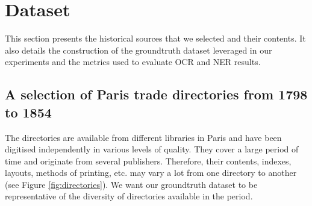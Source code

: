 \section{Dataset}
\label{sec:dataset}






This section presents the historical sources that we selected and their contents. It also details the construction of the groundtruth dataset leveraged in our experiments and the metrics used to evaluate OCR and NER results.

\subsection{A selection of Paris trade directories from 1798 to 1854}
\label{sec:corpus}

The directories are available from different libraries in Paris and have been digitised independently in various levels of quality. 
They cover a large period of time and originate from several publishers.
Therefore, their contents, indexes, layouts, methods of printing, etc. may vary a lot from one directory to another (see Figure \ref{fig:directories}).
We want our groundtruth dataset to be representative of the diversity of directories available in the period.

